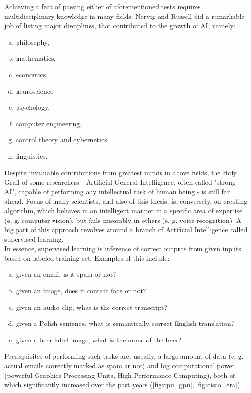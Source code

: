 \documentclass[11pt, a4paper]{article}
\begin{document}
Achieving a feat of passing either of aforementioned tests requires multidisciplinary knowledge in many fields. Norvig and Russell \cite{ai_modern_approach} did a remarkable job of listing major disciplines, that contributed to the growth of AI, namely:
\begin{enumerate}[a)]
\item philosophy,
\item mathematics,
\item economics,
\item neuroscience,
\item psychology,
\item computer engineering,
\item control theory and cybernetics,
\item linguistics.
\end{enumerate}
Despite invaluable contributions from greatest minds in above fields, the Holy Grail of some researchers - Artificial General Intelligence, often called "strong AI", capable of performing any intellectual task of human being - is still far ahead. Focus of many scientists, and also of this thesis, is, conversely, on creating algorithm, which behaves in an intelligent manner in a specific area of expertise (e. g. computer vision), but fails miserably in others (e. g. voice recognition). A big part of this approach revolves around a branch of Artificial Intelligence called supervised learning. \\

In essence, supervised learning is inference of correct outputs from given inputs based on labeled training set. Examples of this include:
\begin{enumerate}[a)]
\item given an email, is it spam or not?
\item given an image, does it contain face or not?
\item given an audio clip, what is the correct transcript?
\item given a Polish sentence, what is semantically correct English translation?
\item given a beer label image, what is the name of the beer?
\end{enumerate}
Prerequisites of performing such tasks are, usually, a large amount of data (e. g. actual emails correctly marked as spam or not) and big computational power (powerful Graphics Processing Units, High-Performance Computing), both of which significantly increased over the past years (\autoref{fig:cpu_gpu}, \autoref{fig:cisco_era}).\\
\end{document}
